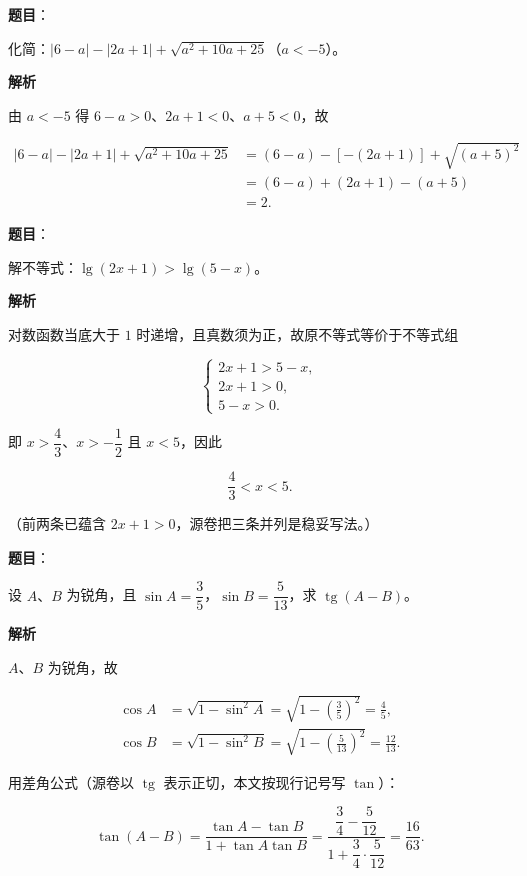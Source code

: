 \begin{answer}

\textbf{题目}：

化简：$|6-a|-|2a+1|+\sqrt{a^2+10a+25}$（$a<-5$）。

\textbf{解析}

由 $a<-5$ 得 $6-a>0$、$2a+1<0$、$a+5<0$，故

\nopagebreak[4]
\[
\begin{aligned}
|6-a|-|2a+1|+\sqrt{a^2+10a+25}
&=(6-a)-\left[-(2a+1)\right]+\sqrt{(a+5)^2}\\
&=(6-a)+(2a+1)-(a+5)\\
&=2.
\end{aligned}
\]


\end{answer}
\begin{answer}

\textbf{题目}：

解不等式：$\lg(2x+1)>\lg(5-x)$。

\textbf{解析}

对数函数当底大于 $1$ 时递增，且真数须为正，故原不等式等价于不等式组

\nopagebreak[4]
\[
\begin{cases}
2x+1>5-x,\\
2x+1>0,\\
5-x>0.
\end{cases}
\]

即 $x>\dfrac43$、$x>-\dfrac12$ 且 $x<5$，因此

\nopagebreak[4]
\[
\frac43<x<5.
\]

（前两条已蕴含 $2x+1>0$，源卷把三条并列是稳妥写法。）


\end{answer}
\begin{answer}

\textbf{题目}：

设 $A\text{、}B$ 为锐角，且 $\sin A=\dfrac35$，$\sin B=\dfrac5{13}$，求 $\operatorname{tg}(A-B)$。

\textbf{解析}

$A\text{、}B$ 为锐角，故

\nopagebreak[4]
\[
\begin{aligned}
\cos A&=\sqrt{1-\sin^2A}=\sqrt{1-\left(\frac35\right)^2}=\frac45,\\
\cos B&=\sqrt{1-\sin^2B}=\sqrt{1-\left(\frac5{13}\right)^2}=\frac{12}{13}.
\end{aligned}
\]

用差角公式（源卷以 $\operatorname{tg}$ 表示正切，本文按现行记号写 $\tan$）：

\nopagebreak[4]
\[
\tan(A-B)=\frac{\tan A-\tan B}{1+\tan A\tan B}
=\frac{\dfrac34-\dfrac5{12}}{1+\dfrac34\cdot\dfrac5{12}}
=\frac{16}{63}.
\]


\end{answer}

